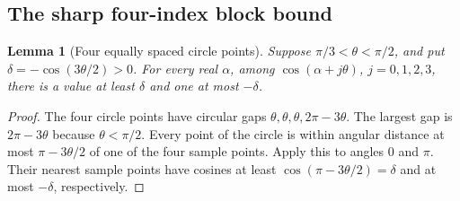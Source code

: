\documentclass[11pt,letterpaper]{article}
\newtheorem{lemma}[theorem]{Lemma}
\theoremstyle{definition}
\numberwithin{equation}{section}
\begin{document}
\subsection{The sharp four-index block bound}

\begin{lemma}[Four equally spaced circle points]\label{lem:four-points}
Suppose $\pi/3<\theta<\pi/2$, and put
$\delta=-\cos(3\theta/2)>0$.
For every real $\alpha$, among
$\cos(\alpha+j\theta)$, $j=0,1,2,3$, there is a value at least $\delta$
and one at most $-\delta$.
\end{lemma}
\begin{proof}
The four circle points have circular gaps
$\theta,\theta,\theta,2\pi-3\theta$.
The largest gap is $2\pi-3\theta$ because $\theta<\pi/2$.
Every point of the circle is within angular distance at most
$\pi-3\theta/2$ of one of the four sample points.
Apply this to angles $0$ and $\pi$. Their nearest sample points have
cosines at least $\cos(\pi-3\theta/2)=\delta$ and at most $-\delta$,
respectively.
\end{proof}
\end{document}
